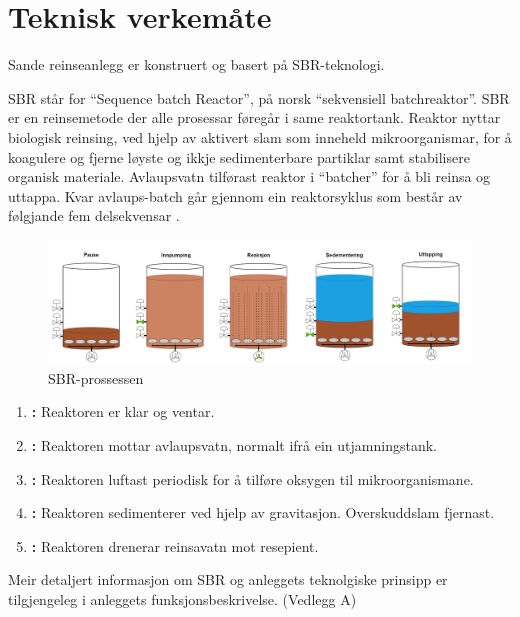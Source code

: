 \newpage
\section{Teknisk verkemåte}
\thispagestyle{fancy}
Sande reinseanlegg er konstruert og basert på \gls{SBR}-teknologi.

\gls{SBR} står for ``Sequence \Gls{batch} Reactor'', på norsk ``sekvensiell \gls{batch}reaktor''.\newline
\gls{SBR} er en reinsemetode der alle prosessar føregår i same reaktortank. 
Reaktor nyttar biologisk reinsing, ved hjelp av aktivert slam som inneheld mikroorganismar, for å koagulere 
og fjerne løyste og ikkje sedimenterbare partiklar samt stabilisere organisk materiale. 
Avlaupsvatn tilførast reaktor i ``batcher'' for å bli reinsa og uttappa. 
Kvar avlaups-batch går gjennom ein reaktorsyklus som består av følgjande fem delsekvensar \citep{Statsforvalter}.
\newline

\begin{figure}[htbp]
    \centering
    \includegraphics[width=1\textwidth]{Figurar/SBR-V2.png}
    \caption{\gls{SBR}-prossessen}\label{fig:SBR-Prosessen}
\end{figure}


\begin{enumerate}
    \item \textbf{:} Reaktoren er klar og ventar.
    \item \textbf{:} Reaktoren mottar avlaupsvatn, normalt ifrå ein utjamningstank.
    \item \textbf{:} Reaktoren luftast periodisk for å tilføre oksygen til mikroorganismane.
    \item \textbf{:} Reaktoren sedimenterer ved hjelp av gravitasjon. Overskuddslam fjernast.
    \item \textbf{:} Reaktoren drenerar reinsavatn mot resepient.
\end{enumerate}

Meir detaljert informasjon om \gls{SBR} og anleggets teknolgiske prinsipp er tilgjengeleg i anleggets
funksjonsbeskrivelse. (Vedlegg A)

